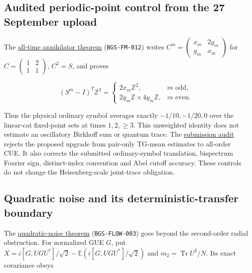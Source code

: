 \hypertarget{audited-periodic-point-control-from-the-27-september-upload}{%
\subsection{Audited periodic-point control from the 27 September upload}\label{audited-periodic-point-control-from-the-27-september-upload}}

The \href{https://github.com/ChurilovMaksim/BGS/blob/main/mathematics/frozen_periodic_point_annihilator.md}{all-time annihilator theorem}
(\texttt{BGS-FM-012}) writes
\(C^m=\left(\begin{smallmatrix}x_m&2y_m\\y_m&x_m\end{smallmatrix}\right)\)
for \(C=\left(\begin{smallmatrix}1&2\\1&1\end{smallmatrix}\right)\),
\(C^2=S\), and proves

\[
(S^m-I)^T\mathbb Z^2=
\begin{cases}2x_m\mathbb Z^2,&m\text{ odd},\\
2y_m\mathbb Z\times4y_m\mathbb Z,&m\text{ even}.
\end{cases}
\]

Thus the physical ordinary symbol averages exactly \(-1/10,-1/20,0\)
over the linear-cat fixed-point sets at times \(1,2,\ge3\). This unweighted
identity does not estimate an oscillatory Birkhoff sum or quantum trace.
The \href{https://github.com/ChurilovMaksim/BGS/blob/main/archive/record/cue_upload_review_20260927.md}{submission audit} rejects
the proposed upgrade from pair-only TG-mean estimates to all-order CUE.
It also corrects the submitted ordinary-symbol translation, bispectrum
Fourier sign, distinct-index convention and Abel cutoff accuracy.
These controls do not change the Heisenberg-scale joint-trace obligation.

\hypertarget{quadratic-noise-and-its-deterministic-transfer-boundary}{%
\subsection{Quadratic noise and its deterministic-transfer boundary}\label{quadratic-noise-and-its-deterministic-transfer-boundary}}

The \href{https://github.com/ChurilovMaksim/BGS/blob/main/mathematics/quadratic_coboundary_noise.md}{quadratic-noise theorem}
(\texttt{BGS-FLOW-003}) goes beyond the second-order radial obstruction. For
normalized GUE \(G\), put \(X=i[G,UGU^*]/\sqrt2-\mathbb E(i[G,UGU^*]/\sqrt2)\)
and \(m_2=\operatorname{Tr}U^2/N\). Its exact covariance obeys

